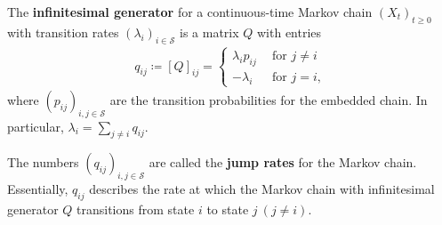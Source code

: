 \begin{defn}{}{}
The \textbf{infinitesimal generator } for a continuous-time Markov chain \((X_{t} )_{t \geq 0}\) with transition rates \((\lambda _{i} )_{i \in  \mathcal{S} } \) is a matrix \(Q\) with entries 
\begin{align*}
    q_{ij}\coloneqq [Q]_{ij} = \begin{cases}
        \lambda _{i} p_{ij} \ \ &\text{for  } j\neq i\\
        -\lambda  _{i}  \ \ &\text{for } j = i, 
    \end{cases}
\end{align*}
where \((p_{ij} )_{i,j \in \mathcal{S} }\) are the transition probabilities for the embedded chain. In particular, \(\lambda _{i} = \sum_{j\neq i}q_{ij}  \). 

The numbers \((q_{ij} )_{i,j \in \mathcal{S} }\) are called the \textbf{jump rates } for the Markov chain. Essentially, \(q_{ij} \) describes the rate at which the Markov chain with infinitesimal generator \(Q\) transitions from state \(i\) to state \(j \ (j\neq i)\). 
\end{defn}

